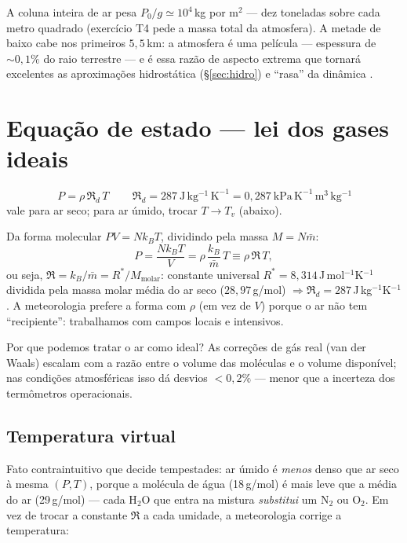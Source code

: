 \documentclass[11pt]{article}
\begin{document}
A coluna inteira de ar pesa $P_0/g \simeq 10^4$\,kg por m$^2$ — dez
toneladas sobre cada metro quadrado (exercício T4 pede a massa total da
atmosfera). A metade de baixo cabe nos primeiros $5{,}5$\,km: a atmosfera é
uma película — espessura de $\sim 0{,}1\%$ do raio terrestre — e é essa
razão de aspecto extrema que tornará excelentes as aproximações hidrostática
(\S\ref{sec:hidro}) e ``rasa'' da dinâmica .

\section{Equação de estado --- lei dos gases ideais}\label{sec:gas}

\begin{noquadro}
\[ \boxed{\,P = \rho\, \Re_d\, T\,}\qquad
\Re_d = 287\ \mathrm{J\,kg^{-1}\,K^{-1}} =
0{,}287\ \mathrm{kPa\,K^{-1}\,m^3\,kg^{-1}} \]
vale para ar seco; para ar úmido, trocar $T \to T_v$ (abaixo).
\end{noquadro}

\begin{formadif}
Da forma molecular $PV = N k_B T$, dividindo pela massa $M = N\bar m$:
\[ P = \frac{N k_B T}{V} = \rho\,\frac{k_B}{\bar m}\,T \equiv \rho\,\Re\,T, \]
ou seja, $\Re = k_B/\bar m = R^*/M_{\text{molar}}$: constante universal
$R^* = 8{,}314$\,J\,mol$^{-1}$K$^{-1}$ dividida pela massa molar média do ar
seco ($28{,}97$\,g/mol) $\Rightarrow \Re_d = 287$\,J\,kg$^{-1}$K$^{-1}$.
A meteorologia prefere a forma com $\rho$ (em vez de $V$) porque o ar não tem
``recipiente'': trabalhamos com campos locais e intensivos.
\end{formadif}

Por que podemos tratar o ar como ideal? As correções de gás real (van der
Waals) escalam com a razão entre o volume das moléculas e o volume
disponível; nas condições atmosféricas isso dá desvios $<0{,}2\%$ — menor
que a incerteza dos termômetros operacionais.

\subsection{Temperatura virtual}

Fato contraintuitivo que decide tempestades: ar úmido é \emph{menos} denso
que ar seco à mesma $(P,T)$, porque a molécula de água (18\,g/mol) é mais
leve que a média do ar (29\,g/mol) — cada H$_2$O que entra na mistura
\emph{substitui} um N$_2$ ou O$_2$. Em vez de trocar a constante $\Re$ a cada
umidade, a meteorologia corrige a temperatura:
\end{document}
